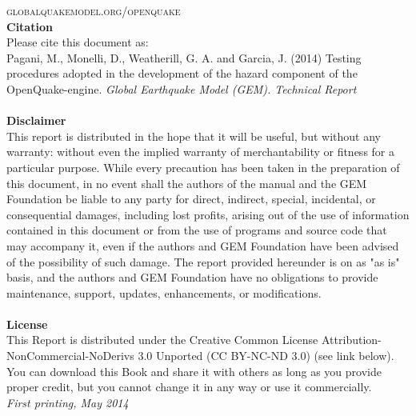 \documentclass[11pt,fleqn]{book} %
\begin{document}
\noindent \textsc{globalquakemodel.org/openquake}\\ %
\noindent
   {\textbf{Citation}} \hfill \\
   Please cite this document as:\\
   Pagani, M., Monelli, D., Weatherill, G. A. and Garcia, J. (2014) Testing procedures adopted in the development of the hazard component of the OpenQuake-engine. \textit{Global Earthquake Model (GEM). Technical Report}\\
   \hfill \\
\noindent
\noindent 
   {\bf{Disclaimer}} \hfill \\
   This report is distributed in 
   the hope that it will be useful, but without any warranty: without 
   even the implied warranty of merchantability or fitness for a 
   particular purpose. While every 
   precaution has been taken in the preparation of this document, in 
   no event shall the authors of the manual and the GEM Foundation be 
   liable to any party for direct, indirect, special, incidental, or 
   consequential damages, including lost profits, arising out of the 
   use of information contained in this document or from the use of 
   programs and source code that may accompany it, even if the authors 
   and GEM Foundation have been advised of the possibility of such damage. 
   The report provided hereunder is on as "as is" basis, and the authors 
   and GEM Foundation have no obligations to provide maintenance, support,
   updates, enhancements, or modifications. 
   \hfill \\
   \vspace{0.4cm} \hfill \\
   {\bf{License}} \hfill \\
   This Report is distributed under the Creative Common License 
   Attribution-NonCommercial-NoDerivs 3.0 Unported (CC BY-NC-ND 3.0) 
   (see link below). You can download this Book and share it with 
   others as long as you provide proper credit, but you cannot change 
   it in any way or use it commercially. 
   \hfill \\

\noindent \textit{First printing, May 2014} %


\end{document}
